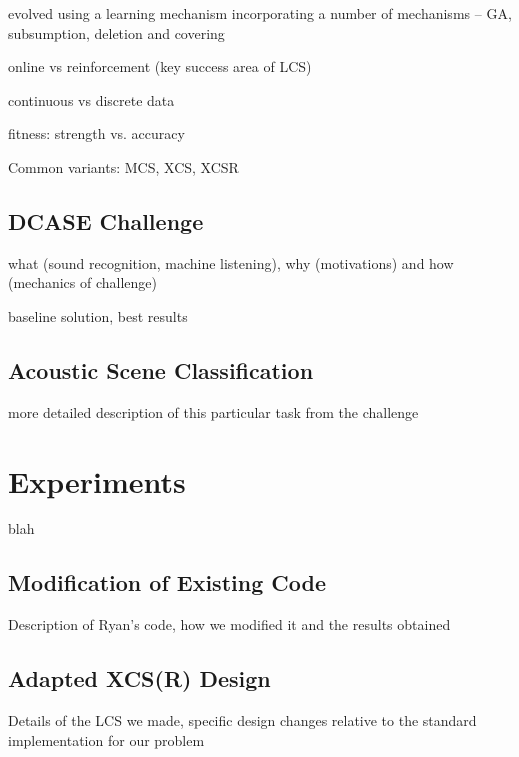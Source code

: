 \documentclass[11pt]{article}
\begin{document}
\begin{multicols}{2}
evolved using a learning mechanism incorporating a number of mechanisms -- GA, subsumption, deletion and covering

online vs reinforcement (key success area of LCS)

continuous vs discrete data

fitness: strength vs. accuracy

Common variants: MCS, XCS, XCSR




\subsection{DCASE Challenge}
\label{sec:DCASE}

what (sound recognition, machine listening), why (motivations) and how (mechanics of challenge)

baseline solution, best results


\subsection{Acoustic Scene Classification}
\label{sec:ASC}

more detailed description of this particular task from the challenge



\section{Experiments}
\label{sec:exp}

blah

\subsection{Modification of Existing Code}
\label{sec:ryan}


Description of Ryan's code, how we modified it and the results obtained



\subsection{Adapted XCS(R) Design}
\label{sec:home}

Details of the LCS we made, specific design changes relative to the standard implementation for our problem





\end{multicols}
\end{document}
